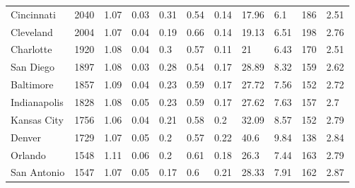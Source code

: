 \documentclass[Afour,sageh,times]{sagej}
\begin{document}
\begin{landscape}
\begin{table}
\begin{tabular}{p{2.5cm} p{1.5cm} p{1.5cm} p{1.5cm} p{1.55cm} p{1.5cm} p{1.5cm} p{1.5cm} p{1.5cm} p{1.5cm} p{1.5cm}}
Cincinnati           & 2040          & 1.07         & 0.03                       & 0.31           & 0.54        & 0.14        & 17.96                 & 6.1                   & 186                   & 2.51             \\
Cleveland            & 2004          & 1.07         & 0.04                       & 0.19           & 0.66        & 0.14        & 19.13                 & 6.51                  & 198                   & 2.76             \\
Charlotte            & 1920          & 1.08         & 0.04                       & 0.3            & 0.57        & 0.11        & 21                    & 6.43                  & 170                   & 2.51             \\
San Diego            & 1897          & 1.08         & 0.03                       & 0.28           & 0.54        & 0.17        & 28.89                 & 8.32                  & 159                   & 2.62             \\
Baltimore            & 1857          & 1.09         & 0.04                       & 0.23           & 0.59        & 0.17        & 27.72                 & 7.56                  & 152                   & 2.72             \\
Indianapolis         & 1828          & 1.08         & 0.05                       & 0.23           & 0.59        & 0.17        & 27.62                 & 7.63                  & 157                   & 2.7              \\
Kansas City          & 1756          & 1.06         & 0.04                       & 0.21           & 0.58        & 0.2         & 32.09                 & 8.57                  & 152                   & 2.79             \\
Denver               & 1729          & 1.07         & 0.05                       & 0.2            & 0.57        & 0.22        & 40.6                  & 9.84                  & 138                   & 2.84             \\
Orlando              & 1548          & 1.11         & 0.06                       & 0.2            & 0.61        & 0.18        & 26.3                  & 7.44                  & 163                   & 2.79             \\
San Antonio          & 1547          & 1.07         & 0.05                       & 0.17           & 0.6         & 0.21        & 28.33                 & 7.91                  & 162                   & 2.87             \\

\end{tabular}
\end{table}
\end{landscape}
\end{document}
